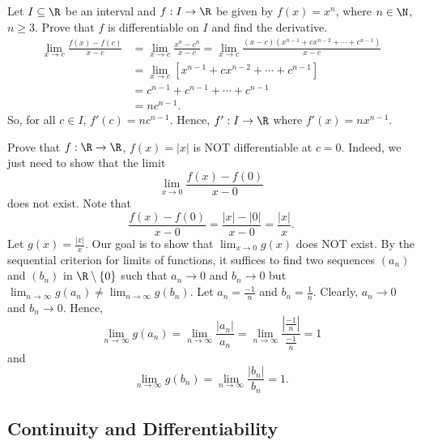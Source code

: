 \begin{eg}
    Let \( I \subseteq  \R  \) be an interval and \( f: I \to \R  \) be given by \( f(x) = x^{n} \), where \( n \in \N  \), \( n \geq 3  \). Prove that \( f  \) is differentiable on \( I  \) and find the derivative.   
    \begin{align*}
        \lim_{ x \to c  }  \frac{ f(x) - f(c) }{ x - c  }  &= \lim_{ x \to c  }  \frac{ x^{n} - c^{n}  }{  x - c  }  = \lim_{ x \to c  }  \frac{ (x - c ) (x^{n-1} + c x^{n-2 } + \cdots + c^{n-1}) }{  x  -c  }  \\
                                                           &= \lim_{ x \to c  }  [x^{n-1} + c x^{n-2 } + \cdots  + c^{n-1} ] \\
                                                           &= c^{n-1 } + c^{n-1} + \cdots + c^{n-1} \\
                                                           &= n c^{n-1}.
    \end{align*}
    So, for all \( c \in I  \), \( f'(c) = n c^{n-1} \). Hence, \( f': I \to \R  \) where \( f'(x) = n x^{n-1 } \).
\end{eg}

\begin{eg}
Prove that \( f: \R \to \R  \), \( f(x) = | x  |  \) is NOT differentiable at \( c = 0  \). Indeed, we just need to show that the limit
\[  \lim_{ x \to 0  }  \frac{ f(x) - f(0) }{ x - 0  }   \]
does not exist. Note that 
\[  \frac{ f(x) - f(0) }{ x - 0 }  = \frac{ | x  |  - | 0  |  }{ x - 0  } = \frac{ | x  |  }{ x  }. \]
Let \( g(x) = \frac{ | x  |  }{ x  }  \). Our goal is to show that \( \lim_{ x \to 0  } g(x) \) does NOT exist. By the sequential criterion for limits of functions, it suffices to find two sequences \( ({a}_{n}) \) and \( ({b}_{n}) \) in \( \R \setminus  \{  0  \}  \) such that \( {a}_{n} \to 0  \) and \( {b}_{n} \to 0  \) but \( \lim_{ n \to \infty  }  g({a}_{n}) \neq \lim_{ n \to \infty  }  g({b}_{n}) \). Let \( {a}_{n}= \frac{ -1  }{ n }  \) and \( {b}_{n} = \frac{ 1 }{ n }  \). Clearly, \( {a}_{n} \to 0  \) and \( {b}_{n} \to 0  \). Hence, 
\[  \lim_{ n \to \infty  }  g({a}_{n}) = \lim_{ n \to \infty  }  \frac{ | {a}_{n} |  }{ {a}_{n} }  = \lim_{ n \to \infty  }  \frac{ | \frac{ -1 }{ n }  |  }{ \frac{ -1 }{ n }  } = 1  \]
and
\[  \lim_{ n \to \infty  }  g({b}_{n}) = \lim_{ n \to \infty  }  \frac{ | {b}_{n} |   }{ {b}_{n}  } = 1.  \]
\end{eg}

\subsection{Continuity and Differentiability}\label{Continuity and Differentiability}



